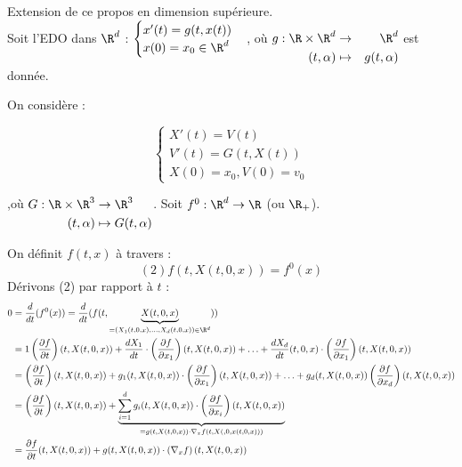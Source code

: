 \documentclass[12pt,a4paper]{article}
\begin{document}
	Extension de ce propos en dimension supérieure.\\
	Soit l'EDO dans $\R^d$ : $\begin{cases}
		x'(t) = g(t,x(t)) \\
		x(0) = x_0 \in \R^d
	\end{cases}$, où $g : \begin{aligned}[t]
		\R \times \R^d
		& \to 
		&\R^d\\
		(t,\alpha)
		& \mapsto
		& g(t,\alpha)
	\end{aligned}$ est donnée.
	\begin{ex}[Newton] On considère :
		
		\[
		\begin{cases}
			X'(t) = V(t)\\
			V'(t) = G(t,X(t))\\
			X(0) = x_0, V(0) = v_0
		\end{cases}
		\]
		
		,où $G : \begin{aligned}[t]
			\R \times \R^3
			& \to \R^3\\
			(t,\alpha) 
			&\mapsto G(t,\alpha)
		\end{aligned}$. Soit $f^0 :\R^d \to \R$ (ou $\R_ +$).
	\end{ex}
	
	On définit $f(t,x)$ à travers :
	\[
	(2) f(t,X(t,0,x)) = f^0(x)
	\]
	Dérivons (2) par rapport à $t$ :
	\[
	\begin{aligned}
		0 
		&= \dfrac{d}{dt}(f^0(x)) = \dfrac{d}{dt}(f(t,\underbrace{X(t,0,x)}_{ = (X_1(t,0,x),\ldots,X_d(t,0,x))\in \R^d}))\\
		&=1\left(\dfrac{\partial f}{\partial t}\right)(t,X(t,0,x)) + \dfrac{dX_1}{dt}\cdot \left(\dfrac{\partial f}{\partial x_1}\right)(t,X(t,0,x)) + \ldots + \dfrac{dX_d}{dt}(t,0,x)\cdot\left(\dfrac{\partial f}{\partial x_1}\right)(t,X(t,0,x))\\
		&=\left(\dfrac{\partial f}{\partial t}\right)(t,X(t,0,x)) + g_1(t,X(t,0,x))\cdot\left(\dfrac{\partial f}{\partial x_1}\right)(t,X(t,0,x))+\ldots+g_d(t,X(t,0,x))\left(\dfrac{\partial f}{\partial x_d}\right)(t,X(t,0,x))\\
		&=\left(\dfrac{\partial f}{\partial t}\right)(t,X(t,0,x)) + \displaystyle\underbrace{\sum_{i=1}^d g_i(t,X(t,0,x)) \cdot\left(\dfrac{\partial  f}{\partial x_i}\right)(t,X(t,0,x))}_{=g(t,X(t,0,x))\cdot\nabla_x f(t,X(,0,x(t,0,x)))}\\
		&= \dfrac{\partial f}{\partial t}(t,X(t,0,x)) + g(t,X(t,0,x))\cdot\left(\nabla_x f\right)(t,X(t,0,x))
	\end{aligned}
	\]
	
\end{document}
